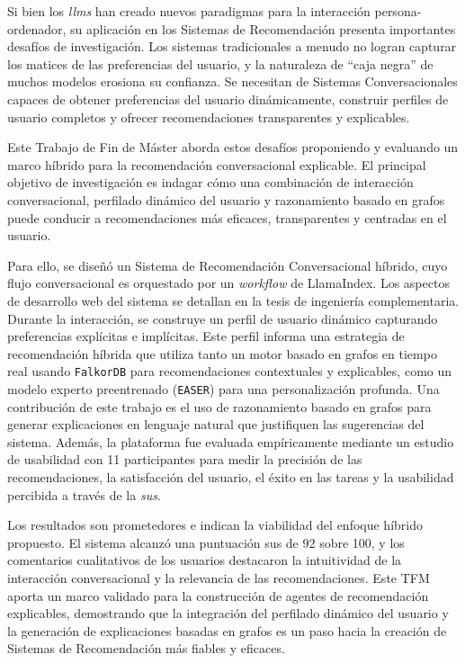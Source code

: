 Si bien los \textit{\acp{llm}} han creado nuevos paradigmas para la interacción persona-ordenador, su aplicación en los Sistemas de Recomendación presenta importantes desafíos de investigación. Los sistemas tradicionales a menudo no logran capturar los matices de las preferencias del usuario, y la naturaleza de ``caja negra'' de muchos modelos erosiona su confianza. Se necesitan de Sistemas Conversacionales capaces de obtener preferencias del usuario dinámicamente, construir perfiles de usuario completos y ofrecer recomendaciones transparentes y explicables.

Este Trabajo de Fin de Máster aborda estos desafíos proponiendo y evaluando un marco híbrido para la recomendación conversacional explicable. El principal objetivo de investigación es indagar cómo una combinación de interacción conversacional, perfilado dinámico del usuario y razonamiento basado en grafos puede conducir a recomendaciones más eficaces, transparentes y centradas en el usuario.

Para ello, se diseñó un Sistema de Recomendación Conversacional híbrido, cuyo flujo conversacional es orquestado por un \textit{workflow} de LlamaIndex. Los aspectos de desarrollo web del sistema se detallan en la tesis de ingeniería complementaria. Durante la interacción, se construye un perfil de usuario dinámico capturando preferencias explícitas e implícitas. Este perfil informa una estrategia de recomendación híbrida que utiliza tanto un motor basado en grafos en tiempo real usando \texttt{FalkorDB} para recomendaciones contextuales y explicables, como un modelo experto preentrenado (\texttt{EASER}) para una personalización profunda. Una contribución de este trabajo es el uso de razonamiento basado en grafos para generar explicaciones en lenguaje natural que justifiquen las sugerencias del sistema. Además, la plataforma fue evaluada empíricamente mediante un estudio de usabilidad con 11 participantes para medir la precisión de las recomendaciones, la satisfacción del usuario, el éxito en las tareas y la usabilidad percibida a través de la \textit{\ac{sus}}.

Los resultados son prometedores e indican la viabilidad del enfoque híbrido propuesto. El sistema alcanzó una puntuación \acs{sus} de 92 sobre 100, y los comentarios cualitativos de los usuarios destacaron la intuitividad de la interacción conversacional y la relevancia de las recomendaciones. Este TFM aporta un marco validado para la construcción de agentes de recomendación explicables, demostrando que la integración del perfilado dinámico del usuario y la generación de explicaciones basadas en grafos es un paso hacia la creación de Sistemas de Recomendación más fiables y eficaces.


\newpage